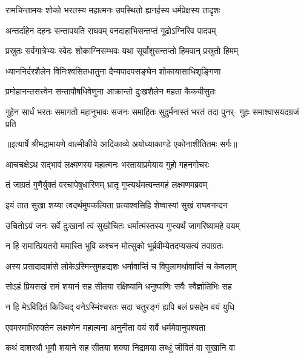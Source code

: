 \twolineshloka
{रामचिन्तामयः शोको भरतस्य महात्मनः}
{उपस्थितो ह्यनर्हस्य धर्मप्रेक्षस्य तादृशः} %

\twolineshloka
{अन्तर्दाहेन दहनः सन्तापयति राघवम्}
{वनदाहाभिसन्तप्तं गूढोऽग्निरिव पादपम्} %

\twolineshloka
{प्रस्रुतः सर्वगात्रेभ्यः स्वेदः शोकाग्निसम्भवः}
{यथा सूर्यांशुसन्तप्तो हिमवान् प्रस्रुतो हिमम्} %

\twolineshloka
{ध्याननिर्दरशैलेन विनिःश्वसितधातुना}
{दैन्यपादपसङ्घेन शोकायासाधिशृङ्गिणा} %

\twolineshloka
{प्रमोहानन्तसत्त्वेन सन्तापौषधिवेणुना}
{आक्रान्तो दुःखशैलेन महता कैकयीसुतः} %

\fourlineindentedshloka
{गुहेन सार्धं भरतः समागतो}
{महानुभावः सजनः समाहितः}
{सुदुर्मनास्तं भरतं तदा पुनर्-}
{गुहः समाश्वासयदग्रजं प्रति} %


{॥इत्यार्षे श्रीमद्रामायणे वाल्मीकीये आदिकाव्ये अयोध्याकाण्डे एकोनाशीतितमः सर्गः॥}


\twolineshloka
{आचचक्षेऽथ सद्भावं लक्ष्मणस्य महात्मनः}
{भरतायाप्रमेयाय गुहो गहनगोचरः} %

\twolineshloka
{तं जाग्रतं गुणैर्युक्तं वरचापेषुधारिणम्}
{भ्रातृ गुप्त्यर्थमत्यन्तमहं लक्ष्मणमब्रवम्} %

\twolineshloka
{इयं तात सुखा शय्या त्वदर्थमुपकल्पिता}
{प्रत्याश्वसिहि शेष्वास्यां सुखं राघवनन्दन} %

\twolineshloka
{उचितोऽयं जनः सर्वे दुःखानां त्वं सुखोचितः}
{धर्मात्मंस्तस्य गुप्त्यर्थं जागरिष्यामहे वयम्} %

\twolineshloka
{न हि रामात्प्रियतरो ममास्ति भुवि कश्चन}
{मोत्सुको भूर्ब्रवीम्येतदप्यसत्यं तवाग्रतः} %

\twolineshloka
{अस्य प्रसादादाशंसे लोकेऽस्मिन्सुमहद्यशः}
{धर्मावाप्तिं च विपुलामर्थावाप्तिं च केवलाम्} %

\twolineshloka
{सोऽहं प्रियसखं रामं शयानं सह सीतया}
{रक्षिष्यामि धनुष्पाणिः सर्वैः स्वैर्ज्ञातिभिः सह} %

\twolineshloka
{न हि मेऽविदितं किञ्चिद् वनेऽस्मिंश्चरतः सदा}
{चतुरङ्गं ह्यपि बलं प्रसहेम वयं युधि} %

\twolineshloka
{एवमस्माभिरुक्तेन लक्ष्मणेन महात्मना}
{अनुनीता वयं सर्वे धर्ममेवानुपश्यता} %

\twolineshloka
{कथं दाशरथौ भूमौ शयाने सह सीतया}
{शक्या निद्रामया लब्धुं जीवितं वा सुखानि वा} %

